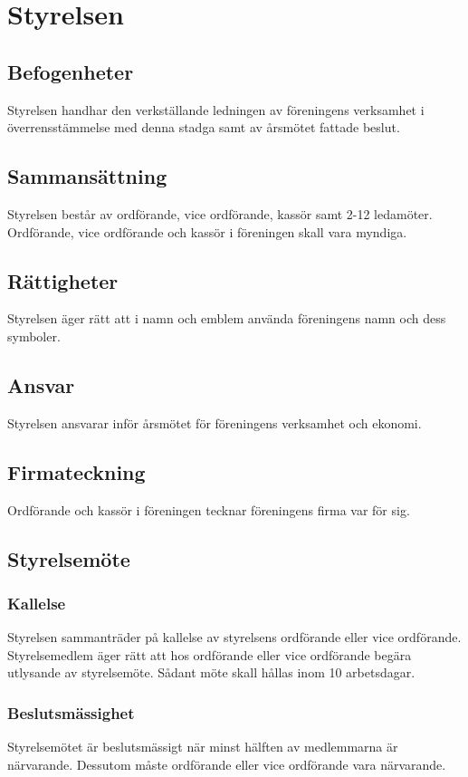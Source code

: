 \section{Styrelsen}
\subsection{Befogenheter}
Styrelsen handhar den verkställande ledningen av föreningens
verksamhet i överrensstämmelse med denna stadga samt av årsmötet
fattade beslut.

\subsection{Sammansättning}
Styrelsen består av ordförande, vice ordförande, kassör samt 2-12 ledamöter.
Ordförande, vice ordförande och kassör i föreningen skall vara myndiga.

\subsection{Rättigheter}
Styrelsen äger rätt att i namn och emblem använda föreningens namn och dess symboler.

\subsection{Ansvar}
Styrelsen ansvarar inför årsmötet för föreningens verksamhet och ekonomi.

\subsection{Firmateckning}
Ordförande och kassör i föreningen tecknar föreningens firma var för sig.

\subsection{Styrelsemöte}
\subsubsection{Kallelse}
Styrelsen sammanträder på kallelse av styrelsens ordförande eller vice ordförande. Styrelsemedlem äger rätt att hos ordförande eller vice ordförande begära utlysande av styrelsemöte. Sådant möte skall hållas inom 10 arbetsdagar.

\subsubsection{Beslutsmässighet}
Styrelsemötet är beslutsmässigt när minst hälften av medlemmarna är närvarande. Dessutom måste ordförande eller vice ordförande vara närvarande.
